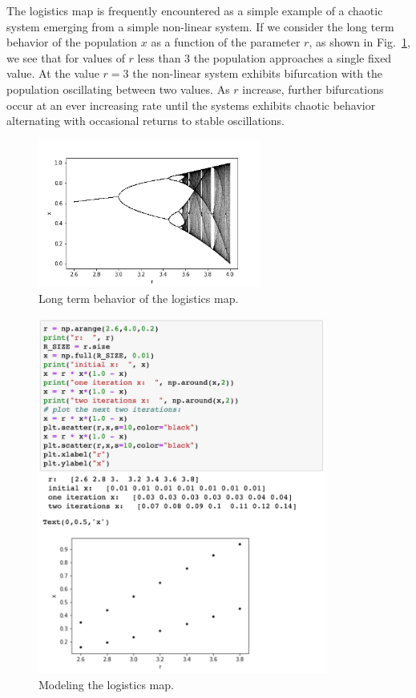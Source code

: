 The logistics map is frequently encountered as a simple example of a
chaotic system emerging from a simple non-linear system.  If we
consider the long term behavior of the population $x$ as a function of
the parameter $r$, as shown in Fig.~\ref{fig:logmap}, we see that for
values of $r$ less than $3$ the population approaches a single fixed
value.  At the value $r=3$ the non-linear system exhibits bifurcation
with the population oscillating between two values.  As $r$ increase,
further bifurcations occur at an ever increasing rate until the
systems exhibits chaotic behavior alternating with occasional returns
to stable oscillations.

\begin{figure}[htbp]
\begin{center}
\includegraphics[width=0.65\textwidth]{figs/plotting/bifurcation.png} 
\caption{Long term behavior of the logistics map.}
\label{fig:logmap}
\end{center}
\end{figure}

\begin{figure}[htbp]
\begin{center}
\includegraphics[width=0.85\textwidth]{figs/plotting/logmapstart.png} 
\caption{Modeling the logistics map.}
\label{fig:logmapstart}
\end{center}
\end{figure}

